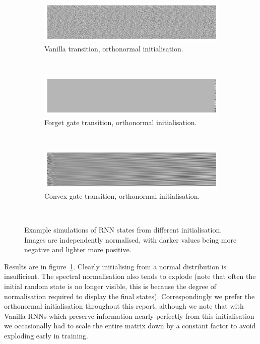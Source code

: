\begin{figure}
\begin{subfigure}[t]{0.3\textwidth}
\includegraphics[width=\textwidth]{appendix/init/vanillaorth}
\caption{Vanilla transition, orthonormal initialisation.}
\end{subfigure}~
\begin{subfigure}[t]{0.3\textwidth}
\includegraphics[width=\textwidth]{appendix/init/lstmorth}
\caption{Forget gate transition, orthonormal initialisation.}
\end{subfigure}~
\begin{subfigure}[t]{0.3\textwidth}
\includegraphics[width=\textwidth]{appendix/init/gruspec}
\caption{Convex gate transition, orthonormal initialisation.}
\end{subfigure}\\

\caption[Simulated RNN states from various initialisations]{Example simulations of RNN states from different initialisation. Images are
independently normalised, with darker values being more negative and lighter more positive.}
\label{fig:inits}
\end{figure}

Results are in figure~\ref{fig:inits}. Clearly initialising from a normal distribution is
insufficient. The spectral normalisation also tends to explode (note that often the initial
random state is no longer visible, this is because the degree of normalisation required
to display the final states). Correspondingly we prefer the orthonormal initialisation
throughout this report, although we note that with Vanilla RNNs which preserve information
nearly perfectly from this initialisation we occasionally had to scale the entire matrix down
by a constant factor to avoid exploding early in training.


